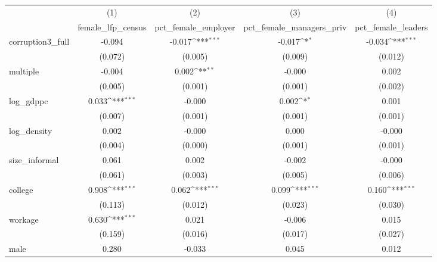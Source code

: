 {
\def\sym#1{\ifmmode^{#1}\else\(^{#1}\)\fi}
\begin{tabular}{l*{4}{c}}
\hline\hline
            &\multicolumn{1}{c}{(1)}&\multicolumn{1}{c}{(2)}&\multicolumn{1}{c}{(3)}&\multicolumn{1}{c}{(4)}\\
            &\multicolumn{1}{c}{female\_lfp\_census}&\multicolumn{1}{c}{pct\_female\_employer}&\multicolumn{1}{c}{pct\_female\_managers\_priv}&\multicolumn{1}{c}{pct\_female\_leaders}\\
\hline
corruption3\_full&      -0.094         &      -0.017\sym{***}&      -0.017\sym{*}  &      -0.034\sym{***}\\
            &     (0.072)         &     (0.005)         &     (0.009)         &     (0.012)         \\
[1em]
multiple    &      -0.004         &       0.002\sym{**} &      -0.000         &       0.002         \\
            &     (0.005)         &     (0.001)         &     (0.001)         &     (0.002)         \\
[1em]
log\_gdppc   &       0.033\sym{***}&      -0.000         &       0.002\sym{*}  &       0.001         \\
            &     (0.007)         &     (0.001)         &     (0.001)         &     (0.001)         \\
[1em]
log\_density &       0.002         &      -0.000         &       0.000         &      -0.000         \\
            &     (0.004)         &     (0.000)         &     (0.001)         &     (0.001)         \\
[1em]
size\_informal&       0.061         &       0.002         &      -0.002         &      -0.000         \\
            &     (0.061)         &     (0.003)         &     (0.005)         &     (0.006)         \\
[1em]
college     &       0.908\sym{***}&       0.062\sym{***}&       0.099\sym{***}&       0.160\sym{***}\\
            &     (0.113)         &     (0.012)         &     (0.023)         &     (0.030)         \\
[1em]
workage     &       0.630\sym{***}&       0.021         &      -0.006         &       0.015         \\
            &     (0.159)         &     (0.016)         &     (0.017)         &     (0.027)         \\
[1em]
male        &       0.280         &      -0.033         &       0.045         &       0.012         \\

\end{tabular}}
